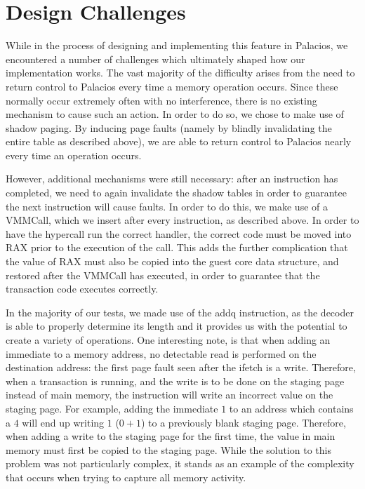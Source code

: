 \documentclass{acm_proc_article-sp}
\begin{document}
\section{Design Challenges}

While in the process of designing and implementing this feature in Palacios, we
encountered a number of challenges which ultimately shaped how our implementation
works. The vast majority of the difficulty arises from the need to return
control to Palacios every time a memory operation occurs. Since these normally
occur extremely often with no interference, there is no existing mechanism to 
cause such an action. In order to do so, we chose to make use of shadow paging.
By inducing page faults (namely by blindly invalidating the entire table as
described above), we are able to return control to Palacios nearly every time
an operation occurs.

However, additional mechanisms were still necessary: after an instruction has
completed, we need to again invalidate the shadow tables in order to guarantee 
the next instruction will cause faults. In order to do this, we make use of a 
VMMCall, which we insert after every instruction, as described above. In order
to have the hypercall run the correct handler, the correct code must be moved
into RAX prior to the execution of the call. This adds the further complication
that the value of RAX must also be copied into the guest core data structure,
and restored after the VMMCall has executed, in order to guarantee that the 
transaction code executes correctly.  

In the majority of our tests, we made use of the addq instruction, as the 
decoder is able to properly determine its length and it provides us with the
potential to create a variety of operations. One interesting note, is that when
adding an immediate to a memory address, no detectable read is performed on
the destination address: the first page fault seen after the ifetch is a write.
Therefore, when a transaction is running, and the write is to be done on the
staging page instead of main memory, the instruction will write an incorrect
value on the staging page. For example, adding the immediate $1$ to an address
which contains a $4$ will end up writing $1$ ($0+1$) to a previously blank
staging page. Therefore, when adding a write to the staging page for the first
time, the value in main memory must first be copied to the staging page. While
the solution to this problem was not particularly complex, it stands as an 
example of the complexity that occurs when trying to capture all memory 
activity.
 
\end{document}
